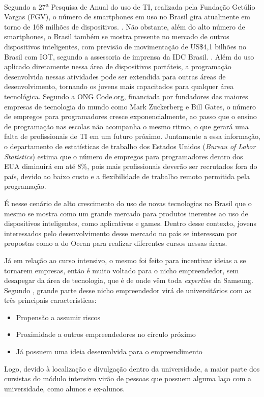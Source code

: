 Segundo a 27\textsuperscript{a} Pesquisa de Anual do uso de TI, realizada pela Fundação Getúlio Vargas (FGV), o número de smartphones em uso no Brasil gira atualmente em torno de 168 milhões de dispositivos. \cite{tifgv}. Não obstante, além do alto número de smartphones, o Brasil também se mostra presente no mercado de outros dispositivos inteligentes, com previsão de movimentação de US\$4,1 bilhões no Brasil com IOT, segundo a assessoria de imprensa da IDC Brasil. \cite{idc}. Além do uso aplicado diretamente nessa área de dispositivos portáteis, a programação desenvolvida nessas atividades pode ser extendida para outras áreas de desenvolvimento, tornando os jovens mais capacitados para qualquer área tecnológica. Segundo a ONG Code.org, financiada por fundadores das maiores empresas de tecnologia do mundo como Mark Zuckerberg e Bill Gates, o número de empregos para programadores cresce exponencialmente, ao passo que o ensino de programação nas escolas não acompanha o mesmo ritmo, o que gerará uma falta de profissionais de TI em um futuro próximo. Juntamente a essa informação, o departamento de estatísticas de trabalho dos Estados Unidos (\textit{Bureau of Labor Statistics}) estima que o número de empregos para programadores dentro dos EUA diminuirá em até 8\%, pois mais profissionais deverão ser recrutados fora do país, devido ao baixo custo e a flexibilidade de trabalho remoto permitida pela programação. \cite{bls}

É nesse cenário de alto crescimento do uso de novas tecnologias no Brasil que o mesmo se mostra como um grande mercado para produtos inerentes ao uso de dispositivos inteligentes, como aplicativos e games. Dentro desse contexto, jovens interessados pelo desenvolvimento desse mercado no país se interessam por propostas como a do Ocean para realizar diferentes cursos nessas áreas.

Já em relação ao curso intensivo, o mesmo foi feito para incentivar ideias a se tornarem empresas, então é muito voltado para o nicho empreendedor, sem desapegar da área de tecnologia, que é de onde vêm toda \textit{expertise} da Samsung. Segundo , grande parte desse nicho empreendedor virá de universitários com as três principais características:

\begin{itemize}
\item Propensão a assumir riscos
\item Proximidade a outros empreendedores no círculo próximo
\item Já possuem uma ideia desenvolvida para o empreendimento
\end{itemize}

Logo, devido à localização e divulgação dentro da universidade, a maior parte dos cursistas do módulo intensivo virão de pessoas que possuem alguma laço com a universidade, como alunos e ex-alunos.
